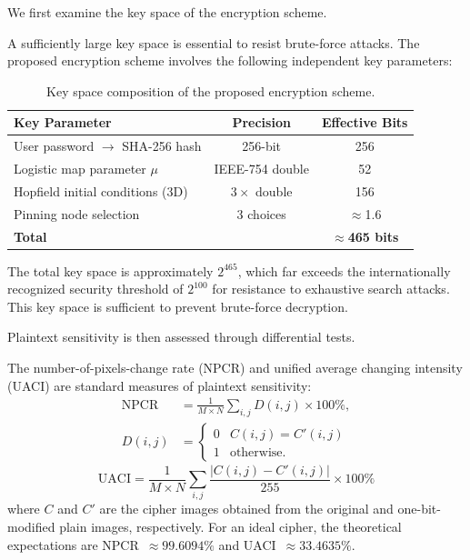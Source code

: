\documentclass[a4paper,fleqn]{cas-dc}
\theoremstyle{plain}
\theoremstyle{definition}
\begin{document}
We first examine the key space of the encryption scheme.

A sufficiently large key space is essential to resist brute-force attacks. The proposed encryption scheme involves the following independent key parameters:

\begin{table}[pos=!t,width=\textwidth]
	\centering
	\caption{Key space composition of the proposed encryption scheme.}
	\label{tab:key_space}
	\begin{tabular}{lcc}
		\toprule
		\textbf{Key Parameter} & \textbf{Precision} & \textbf{Effective Bits} \\
		\midrule
		User password $\to$ SHA-256 hash & 256-bit & 256 \\
		Logistic map parameter $\mu$ & IEEE-754 double & 52 \\
		Hopfield initial conditions (3D) & $3 \times$ double & 156 \\
		Pinning node selection & 3 choices & $\approx$1.6 \\
		\midrule
		\textbf{Total} & & $\approx$\textbf{465 bits} \\
		\bottomrule
	\end{tabular}
\end{table}

The total key space is approximately $2^{465}$, which far exceeds the internationally recognized security threshold of $2^{100}$ for resistance to exhaustive search attacks. This key space is sufficient to prevent brute-force decryption.

Plaintext sensitivity is then assessed through differential tests.

The number-of-pixels-change rate (NPCR) and unified average changing intensity (UACI) are standard measures of plaintext sensitivity:
\begin{equation}
	\begin{aligned}
	\mathrm{NPCR} &= \frac{1}{M \times N} \sum_{i,j} D(i,j) \times 100\%, \\
	D(i,j) &= \begin{cases} 0 & C(i,j) = C'(i,j) \\ 1 & \text{otherwise}. \end{cases}
	\end{aligned}
\end{equation}
\begin{equation}
	\mathrm{UACI} = \frac{1}{M \times N} \sum_{i,j} \frac{|C(i,j) - C'(i,j)|}{255} \times 100\%
\end{equation}
where $C$ and $C'$ are the cipher images obtained from the original and one-bit-modified plain images, respectively. For an ideal cipher, the theoretical expectations are NPCR~$\approx 99.6094\%$ and UACI~$\approx 33.4635\%$.
\end{document}
